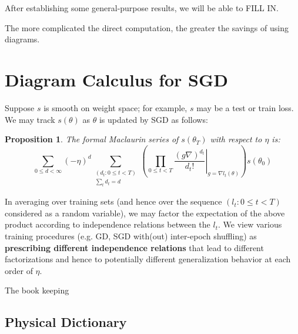 \documentclass{article}
\newtheorem{prop}{Proposition}
\begin{document}
    After establishing some general-purpose results, we will be able to
    {\color{red} FILL IN}. 
    
    The more complicated the direct computation, the greater the savings of
    using diagrams.
        


\section{Diagram Calculus for SGD}
    Suppose $s$ is smooth on weight space; for example, $s$ may be a test or
    train loss.  We may track $s(\theta)$ as $\theta$ is updated by SGD as
    follows:
    \begin{prop}
        The formal Maclaurin series of $s(\theta_T)$ with respect to $\eta$ is:
        \begin{equation*}\label{eq:dyson}
            \sum_{0\leq d < \infty} (-\eta)^d \sum_{\substack{(d_t: 0\leq t<T) \\ \sum_t d_t = d}}
            \left(
                \prod_{0 \leq t < T}
                    \left.  \frac{(g \nabla)^{d_t}}{d_t!} \right|_{g=\nabla l_t(\theta)}
            \right)
            s (\theta_0)
        \end{equation*}
    \end{prop}
    In averaging over training sets (and hence over the sequence $(l_t: 0\leq
    t<T)$ considered as a random variable), we may factor the expectation of
    the above product according to independence relations between the $l_t$.
    We view various training procedures (e.g. GD, SGD with(out) inter-epoch
    shuffling) as {\bf prescribing different independence relations} that lead
    to different factorizations and hence to potentially different
    generalization behavior at each order of $\eta$.

    The book keeping

\subsection*{Physical Dictionary}
\end{document}
